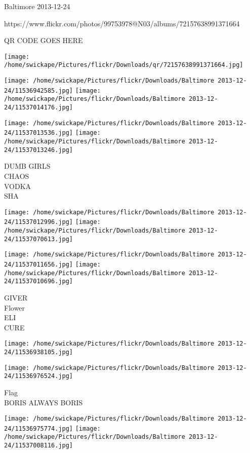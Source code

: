 \documentclass[10pt,letterpaper]{article}
\begin{document}
Baltimore 2013-12-24

https://www.flickr.com/photos/99753978@N03/albums/72157638991371664

QR CODE GOES HERE

\texttt{[image: /home/swickape/Pictures/flickr/Downloads/qr/72157638991371664.jpg]}
\pagebreak

\texttt{[image: /home/swickape/Pictures/flickr/Downloads/Baltimore 2013-12-24/11536942585.jpg]}
\texttt{[image: /home/swickape/Pictures/flickr/Downloads/Baltimore 2013-12-24/11537014176.jpg]}

\texttt{[image: /home/swickape/Pictures/flickr/Downloads/Baltimore 2013-12-24/11537013536.jpg]}
\texttt{[image: /home/swickape/Pictures/flickr/Downloads/Baltimore 2013-12-24/11537013246.jpg]}

DUMB GIRLS\\
CHAOS\\
VODKA\\
SHA\\
\pagebreak

\texttt{[image: /home/swickape/Pictures/flickr/Downloads/Baltimore 2013-12-24/11537012996.jpg]}
\texttt{[image: /home/swickape/Pictures/flickr/Downloads/Baltimore 2013-12-24/11537070613.jpg]}

\texttt{[image: /home/swickape/Pictures/flickr/Downloads/Baltimore 2013-12-24/11537011656.jpg]}
\texttt{[image: /home/swickape/Pictures/flickr/Downloads/Baltimore 2013-12-24/11537010696.jpg]}

GIVER\\
Flower\\
ELI\\
CURE\\
\pagebreak

\texttt{[image: /home/swickape/Pictures/flickr/Downloads/Baltimore 2013-12-24/11536938105.jpg]}

\vspace{0.25in}
\texttt{[image: /home/swickape/Pictures/flickr/Downloads/Baltimore 2013-12-24/11536976524.jpg]}

Flag\\
BORIS ALWAYS BORIS\\
\pagebreak

\texttt{[image: /home/swickape/Pictures/flickr/Downloads/Baltimore 2013-12-24/11536975774.jpg]}
\texttt{[image: /home/swickape/Pictures/flickr/Downloads/Baltimore 2013-12-24/11537008116.jpg]}
\end{document}
